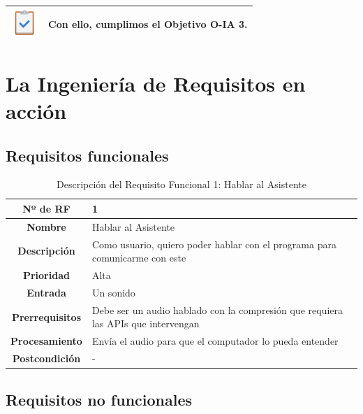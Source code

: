 \begin{table}[H]
	\centering
	\begin{tabularx}{\textwidth}{|>{\columncolor{mintgreen}}c>{\columncolor{mintgreen}}X|}
		\hline
		\includegraphics[width=30pt]{imagenes/Tarea_completada.png} & Con ello, cumplimos el Objetivo O-IA 3. \\
		\hline
	\end{tabularx}
\end{table}

\section{La Ingeniería de Requisitos en acción}

\subsection{Requisitos funcionales}

\begin{table}[H]
	\centering
	\begin{tabularx}{\textwidth}{|c|X|} 
		\hline
		\textbf{Nº de RF }          &  1 \\ 
		\hline
		\textbf{Nombre}         &  Hablar al Asistente \\ 
		\hline
		\textbf{Descripción}    &  Como usuario, quiero poder hablar con el programa para comunicarme con este \\ 
		\hline
		\textbf{Prioridad}      &  Alta  \\ 
		\hline
		\textbf{Entrada}        & Un sonido  \\ 
		\hline
		\textbf{Prerrequisitos} & Debe ser un audio hablado con la compresión que requiera las APIs que intervengan  \\ 
		\hline
		\textbf{Procesamiento}  &  Envía el audio para que el computador lo pueda entender \\ 
		\hline
		\textbf{Postcondición}  &  - \\
		\hline
	\end{tabularx}
	\caption{Descripción del Requisito Funcional 1: Hablar al Asistente}
\end{table}
\subsection{Requisitos no funcionales}
 